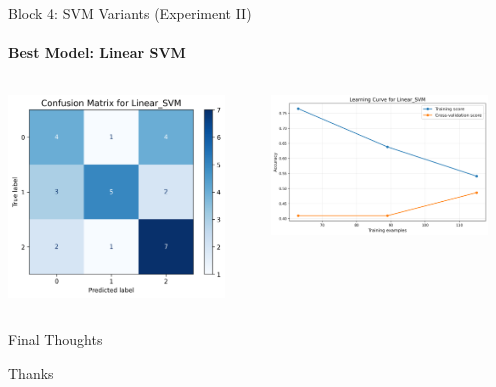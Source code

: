 \documentclass[9pt]{beamer}
\begin{document}
    \begin{frame}{Block 4: SVM Variants (Experiment II)}
    \framesubtitle{Best Model: Linear SVM}
    \begin{columns}
        \begin{column}{0.5\textwidth}
            \centering
            \includegraphics[width=0.9\textwidth]{code/ResultsMainAugZip/plots/Block4_SVM_Variants_Experiment_II/confusion_matrix_Linear_SVM.png}
        \end{column}
        \begin{column}{0.5\textwidth}
            \centering
            \includegraphics[width=0.9\textwidth]{code/ResultsMainAugZip/plots/Block4_SVM_Variants_Experiment_II/learning_curve_Linear_SVM.png}
        \end{column}
    \end{columns}
    \end{frame}

    \begin{frame} { \LARGE Final Thoughts } \end{frame}

    \begin{frame} { \LARGE Thanks } \end{frame}
\end{document}
